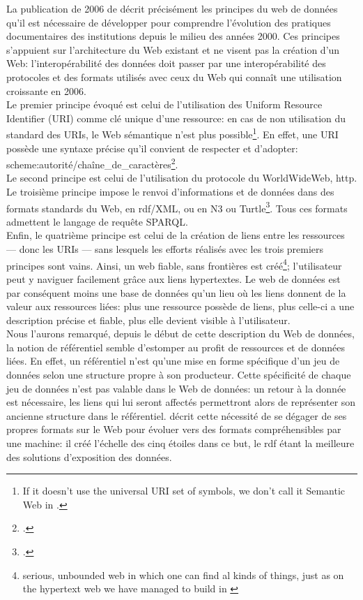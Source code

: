 La publication de 2006 de  décrit précisément les principes du web de données qu'il est nécessaire de développer pour comprendre l'évolution des pratiques documentaires des institutions depuis le milieu des années 2000. Ces principes s'appuient sur l'architecture du Web existant et ne visent pas la création d'un Web: l'interopérabilité des données doit passer par une interopérabilité des protocoles et des formats utilisés avec ceux du Web qui connaît une utilisation croissante en 2006.\\

Le premier principe évoqué est celui de l'utilisation des Uniform Resource Identifier (URI) comme clé unique d'une ressource: en cas de non utilisation du standard des URIs, le Web sémantique n'est plus possible\footnote{\og If it doesn't use the universal URI set of symbols, we don't call it Semantic Web\fg{} in \cite{berners-lee_linked_2006}.}. En effet, une URI possède une syntaxe précise qu'il convient de respecter et d'adopter: scheme:autorité/chaîne\_de\_caractères\footcite[§40]{bermes_2_2013}.\\

Le second principe est celui de l'utilisation du protocole du WorldWideWeb, \ac{http}.\\

Le troisième principe impose le renvoi d'informations et de données dans des formats standards du Web, en \ac{rdf}/XML, ou en N3 ou Turtle\footcite{berners-lee_linked_2006}. Tous ces formats admettent le langage de requête SPARQL.\\

Enfin, le quatrième principe est celui de la création de liens entre les ressources --- donc les URIs --- sans lesquels les efforts réalisés avec les trois premiers principes sont vains. Ainsi, un web fiable, sans frontières est créé\footnote{\og serious, unbounded web in which one can find al kinds of things, just as on the hypertext web we have managed to build\fg{} in \cite{berners-lee_linked_2006}}; l'utilisateur peut y naviguer facilement grâce aux liens hypertextes. Le web de données est par conséquent moins une base de données qu'un lieu où les liens donnent de la valeur aux ressources liées: plus une ressource possède de liens, plus celle-ci a une description précise et fiable, plus elle devient visible à l'utilisateur.\\

Nous l'aurons remarqué, depuis le début de cette description du Web de données, la notion de référentiel semble d'estomper au profit de ressources et de données liées. En effet, un référentiel n'est qu'une mise en forme spécifique d'un jeu de données selon une structure propre à son producteur. Cette spécificité de chaque jeu de données n'est pas valable dans le Web de données: un retour à la donnée est nécessaire, les liens qui lui seront affectés permettront alors de représenter son ancienne structure dans le référentiel.  décrit cette nécessité de se dégager de ses propres formats sur le Web pour évoluer vers des formats compréhensibles par une machine: il créé l'échelle des cinq étoiles dans ce but, le \ac{rdf} étant la meilleure des solutions d'exposition des données.

